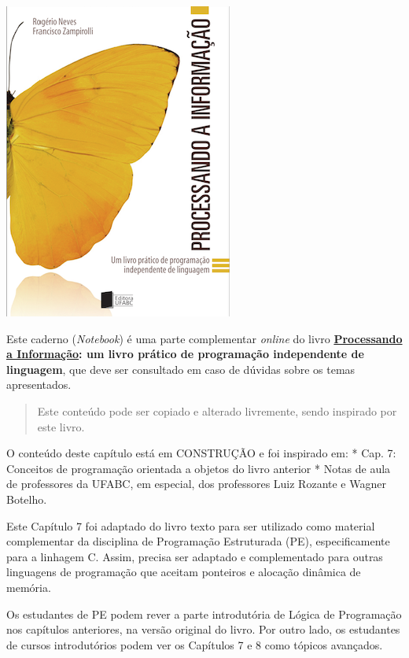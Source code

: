 \documentclass[12pt,a4paper]{article}
\begin{document}
    \includegraphics{"figs/Capa_Processando_Informacao.jpg"}

Este caderno (\emph{Notebook}) é uma parte complementar \emph{online} do
livro
\textbf{\href{https://editora.ufabc.edu.br/matematica-e-ciencias-da-computacao/58-processando-a-informacao}{Processando
a Informação}: um livro prático de programação independente de
linguagem}, que deve ser consultado em caso de dúvidas sobre os temas
apresentados.

\begin{quote}
Este conteúdo pode ser copiado e alterado livremente, sendo inspirado
por este livro.
\end{quote}

    O conteúdo deste capítulo está em CONSTRUÇÃO e foi inspirado em: * Cap.
7: Conceitos de programação orientada a objetos do livro anterior *
Notas de aula de professores da UFABC, em especial, dos professores Luiz
Rozante e Wagner Botelho.

Este Capítulo 7 foi adaptado do livro texto para ser utilizado como
material complementar da disciplina de Programação Estruturada (PE),
especificamente para a linhagem C. Assim, precisa ser adaptado e
complementado para outras linguagens de programação que aceitam
ponteiros e alocação dinâmica de memória.

Os estudantes de PE podem rever a parte introdutória de Lógica de
Programação nos capítulos anteriores, na versão original do livro. Por
outro lado, os estudantes de cursos introdutórios podem ver os Capítulos
7 e 8 como tópicos avançados.
\end{document}
